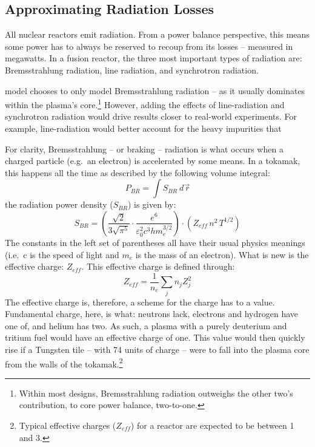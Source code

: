 \subsection{Approximating Radiation Losses}

All nuclear reactors emit radiation. From a power balance perspective, this means some power has to always be reserved to recoup from its losses -- measured in megawatts. In a fusion reactor, the three most important types of radiation are: Bremsstrahlung radiation, line radiation, and synchrotron radiation.

 model chooses to only model Bremsstrahlung radiation -- as it usually dominates within the plasma's core.\footnote{Within most designs, Bremsstrahlung radiation outweighs the other two's contribution, to core power balance, two-to-one.\cite{ussteady,inputfile} } However, adding the effects of line-radiation and synchrotron radiation would drive results closer to real-world experiments. For example, line-radiation would better account for the  heavy impurities that 

For clarity, Bremsstrahlung -- or braking -- radiation is what occurs when a charged particle (e.g.\ an electron) is accelerated by some means. In a tokamak, this happens all the time as   described by the following volume integral:
\begin{equation}
	P_{BR} = \int S_{BR} \ d \vec{\,r}
\end{equation}
 the radiation power density ($S_{BR}$) is given by:
\begin{equation}
	S_{BR} = \left( \frac{\sqrt{2}}{3 \sqrt{\pi^5}} \cdot \frac{e^6}{\varepsilon_0^2 c^3 h m_e^{3/2}} \right) \cdot \left( Z_{eff} \, n^2 \, T^{1/2} \right)
\end{equation}
The constants in the left set of parentheses all have their usual physics meanings (i.e.\ c is the speed of light and $m_e$ is the mass of an electron). What is new is the effective charge: $Z_{eff}$. This effective charge is defined through:\cite{jeff}
\begin{equation}
	Z_{eff} = \frac{1}{n_e} \sum_j n_j Z_j^2
\end{equation}
The effective charge is, therefore, a scheme for  the charge  has to a  value. Fundamental charge, here, is what: neutrons lack, electrons and hydrogen have one of, and helium has two. As such, a plasma with a purely deuterium and tritium fuel would have an effective charge of one. This value would then quickly rise if a Tungsten tile -- with 74 units of charge -- were to fall into the plasma core from the walls of the tokamak.\footnote{Typical effective charges ($Z_{eff}$) for a reactor are expected to be between 1 and 3.\cite{ussteady,inputfile,arc}}

